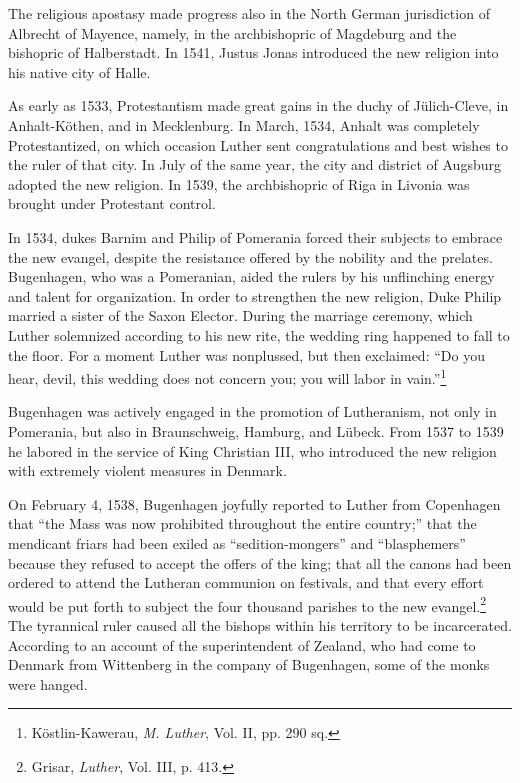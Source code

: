 The religious apostasy made progress also in the North German
jurisdiction of Albrecht of Mayence, namely, in the archbishopric of
Magdeburg and the bishopric of Halberstadt. In 1541, Justus Jonas
introduced the new religion into his native city of Halle.

As early as 1533, Protestantism made great gains in the duchy of
Jülich-Cleve, in Anhalt-Köthen, and in Mecklenburg. In March,
1534, Anhalt was completely Protestantized, on which occasion Luther
sent congratulations and best wishes to the ruler of that city. In July
of the same year, the city and district of Augsburg adopted the new
religion. In 1539, the archbishopric of Riga in Livonia was brought
under Protestant control.

In 1534, dukes Barnim and Philip of Pomerania forced their subjects to
embrace the new evangel, despite the resistance offered by
the nobility and the prelates. Bugenhagen, who was a Pomeranian,
aided the rulers by his unflinching energy and talent for organization.
In order to strengthen the new religion, Duke Philip married a sister
of the Saxon Elector. During the marriage ceremony, which Luther
solemnized according to his new rite, the wedding ring happened to
fall to the floor. For a moment Luther was nonplussed, but then exclaimed:
“Do you hear, devil, this wedding does not concern you; you
will labor in vain.”\footnote{Köstlin-Kawerau, \textit{M. Luther}, Vol. II, pp. 290 sq.}

Bugenhagen was actively engaged in the promotion of Lutheranism,
not only in Pomerania, but also in Braunschweig, Hamburg, and
Lübeck. From 1537 to 1539 he labored in the service of King Christian
III, who introduced the new religion with extremely violent
measures in Denmark.

On February 4, 1538, Bugenhagen joyfully reported to Luther from
Copenhagen that “the Mass was now prohibited throughout the entire
country;” that the mendicant friars had been exiled as “sedition-mongers”
and “blasphemers” because they refused to accept the offers of the king;
that all the canons had been ordered to attend the Lutheran communion on
festivals, and that every effort would be put forth to subject the four
thousand parishes to the new evangel.\footnote{Grisar, \textit{Luther}, Vol. III, p. 413.}
 The tyrannical ruler caused all the
bishops within his territory to be incarcerated. According to an account of
the superintendent of Zealand, who had come to Denmark from Wittenberg
in the company of Bugenhagen, some of the monks were hanged.

